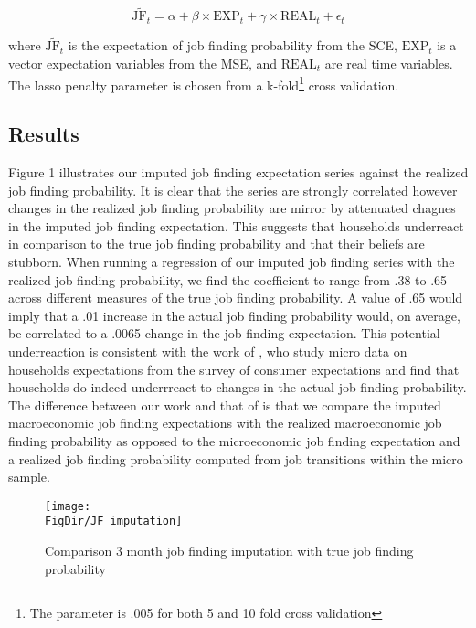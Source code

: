 \documentclass[titlepage]{\econtex}\providecommand{\texname}{Dissertation-Proposal}
\providecommand{\FigDir}{Figures}
\begin{document}
 $$\widetilde{\text{JF}_t} = \alpha + \beta \times \text{EXP}_t + \gamma\times \text{REAL}_{t}+\epsilon_t$$
 
where $\widetilde{\text{JF}_t}$ is the expectation of job finding probability from the SCE, $\text{EXP}_t $ is a vector expectation variables from the MSE, and $\text{REAL}_{t}$ are real time variables. The lasso penalty parameter is chosen from a k-fold\footnote{The parameter is .005 for both 5 and 10 fold cross validation} cross validation.


\subsection{Results}
\label{subsec:Results}


Figure 1 illustrates our imputed job finding expectation series against the realized job finding probability. It is clear that the series are strongly correlated however changes in the realized job finding probability are mirror by attenuated chagnes in the imputed job finding expectation. This suggests that households underreact in comparison to the true job finding probability and that their beliefs are stubborn. When running a regression of our imputed job finding series with the realized job finding probability, we find the coefficient to range from .38 to .65 across different measures of the true job finding probability. A value of .65 would imply that a .01 increase in the actual job finding probability would, on average, be correlated to a .0065 change in the job finding expectation. This potential underreaction is consistent with the work of \cite{mueller2021job}, who study micro data on households expectations from the survey of consumer expectations and find that households do indeed underrreact to changes in the actual job finding probability. The difference between our work and that of \cite{mueller2021job} is that we compare the imputed macroeconomic job finding expectations with the realized macroeconomic job finding probability as opposed to the microeconomic job finding expectation and a realized job finding probability computed from job transitions within the micro sample. 

\begin{figure}{}
    \centering
        \caption{Comparison 3 month job finding imputation with true job finding probability }
        \texttt{[image: \\FigDir/JF\_imputation]}
\end{figure} 

\end{document}
